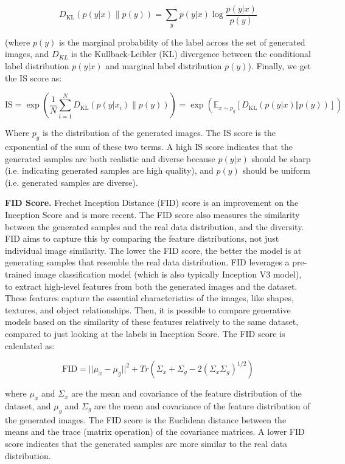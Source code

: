 \[
    D_{\text{KL}}(p(y|x) \| p(y)) = \sum_{y} p(y|x) \log \frac{p(y|x)}{p(y)}
\]

(where $p(y)$ is the marginal probability of the label across the set of generated images, and $D_{KL}$ is the Kullback-Leibler (KL) divergence between the conditional label distribution $p(y|x)$ and marginal label distribution $p(y)$). Finally, we get the IS score as:

\[
    \text{IS} = \exp \left( \frac{1}{N} \sum_{i=1}^{N} D_{\text{KL}}(p(y|x_i) \| p(y)) \right) = \exp(\mathbb{E}_{x \sim p_g} \left[ D_{\text{KL}} \left( p(y | x) \Vert p(y) \right) \right])
\]

Where $p_g$ is the distribution of the generated images. The IS score is the exponential of the sum of these two terms. A high IS score indicates that the generated samples are both realistic and diverse because $p(y|x)$ should be sharp (i.e. indicating generated samples are high quality), and $p(y)$ should be uniform (i.e. generated samples are diverse).






\textbf{FID Score.} Frechet Inception Distance (FID) score \cite{fid_score} is an improvement on the Inception Score and is more recent. The FID score also measures the similarity between the generated samples and the real data distribution, and the diversity. FID aims to capture this by comparing the feature distributions, not just individual image similarity. The lower the FID score, the better the model is at generating samples that resemble the real data distribution. FID leverages a pre-trained image classification model (which is also typically Inception V3 model), to extract high-level features from both the generated images and the dataset. These features capture the essential characteristics of the images, like shapes, textures, and object relationships. Then, it is possible to compare generative models based on the similarity of these features relatively to the same dataset, compared to just looking at the labels in Inception Score. The FID score is calculated as:

\begin{equation}
    \text{FID} = ||\mu_x - \mu_g||^2 + Tr(\Sigma_x + \Sigma_g - 2(\Sigma_x\Sigma_g)^{1/2})
    \label{eq:fid_score}
\end{equation}

where $\mu_x$ and $\Sigma_x$ are the mean and covariance of the feature distribution of the dataset, and $\mu_g$ and $\Sigma_g$ are the mean and covariance of the feature distribution of the generated images. The FID score is the Euclidean distance between the means and the trace (matrix operation) of the covariance matrices. A lower FID score indicates that the generated samples are more similar to the real data distribution.

